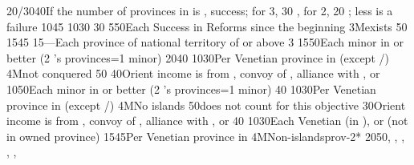 {20/30}{40}{If the number of provinces in \payscrimee is , success; for
  3, 30 \VPs, for 2, 20 \VPs; less is a failure}%
%
%
{10}{45}{}%
%
%
{10}{30}{\EU@objSpiceTUR}%
%
%
%
{}{30}{}%
%
%
{5}{50}{Each Success in Reforms since the beginning}%
%
\EUobjective3M{\payscrimee exists}{}%
{}{50}{}%
%
%
{15}{45}{}%
%
%
{15}{---}{Each province of national territory of  or
   above 3}%
%
 
%
%
{15}{50}{Each minor in \EG or better (2 's provinces=1 minor)}%
%
%
{20}{40}{}%
%
%
{10}{30}{Per Venetian province in \regionBalkans (except
  \provinceHellas/\provinceMoreas)}%
%
\EUobjective4M{\paysmamelouks not conquered}{}%
{}{50}{}%
%
%
{}{40}{Orient income is from , convoy of \villeIzmir,
  alliance with \paysaden, \paysoman or \paysgujarat}%
%
%
%
{10}{50}{Each minor in \EG or better (2 's provinces=1 minor)}%
%
%
{}{40}{}%
%
%
{10}{30}{Per Venetian province in \regionBalkans (except
  \provinceHellas/\provinceMoreas)}%
%
\EUobjective4M{No \TUR islands}{}%
{}{50}{\provinceRhodos does not count for this objective}%
%
%
{}{30}{Orient income is from , convoy of \villeIzmir,
  alliance with \paysaden, \paysoman or \paysgujarat}%
%
%
%
{}{40}{}%
%
%
{10}{30}{Each Venetian \Presidio (in ), or \regionBalkans
  (not in owned province)}%
%
%
{15}{45}{Per Venetian province in \regionBalkans}%
%
\EUobjective4M{Non-\TUR islands}{prov-2*}%
{20}{50}{\provinceChypre, \provinceKreta, \provinceCyclades, \provinceCorfu,
  \provinceMalta, \provinceRhodos}%
%
%
%
